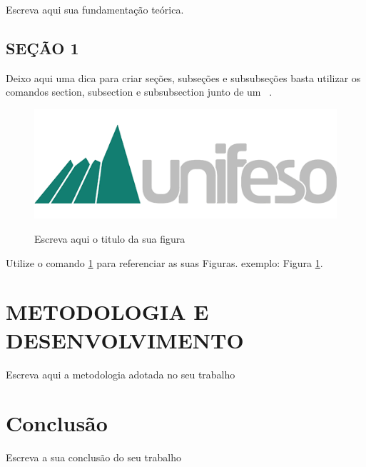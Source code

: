 \documentclass[
	12pt,				%
	openright,			%
	oneside,			%
	a4paper,			%
	chapter=TITLE,		%
	section=TITLE,		%
	subsection=TITLE,	%
	subsubsection=TITLE,%
	english,			%
	brazil				%
	]{abntex2}
\theoremstyle{definition}
\begin{document}
Escreva aqui sua fundamentação teórica.

\section{SEÇÃO 1}

Deixo aqui uma dica para criar seções, subseções e subsubseções basta utilizar os comandos section, subsection e subsubsection junto de um \ .

\begin{figure}[!h]
\centering
\caption{Escreva aqui o titulo da sua figura}
\includegraphics [scale=0.5]{UNIFESO.png} %
\label{unifeso} %
\end{figure}

Utilize o comando \ref{unifeso} para referenciar as suas Figuras.
exemplo: Figura \ref{unifeso}.


\chapter{METODOLOGIA E DESENVOLVIMENTO}

Escreva aqui a metodologia adotada no seu trabalho

\chapter{Conclusão}

Escreva a sua conclusão do seu trabalho


\postextual
\end{document}
